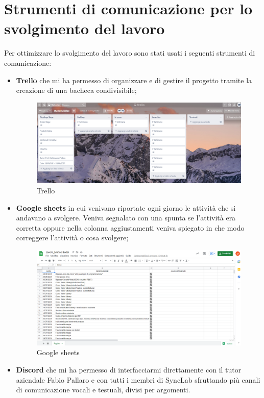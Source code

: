 \section{Strumenti di comunicazione per lo svolgimento del lavoro}
Per ottimizzare lo svolgimento del lavoro sono stati usati i seguenti strumenti di comunicazione:
\begin{itemize}
	\item \textbf{Trello} che mi ha permesso di organizzare e di gestire il progetto tramite la creazione di una bacheca condivisibile;
	\begin{figure}[htbp]	
		\centering
		\includegraphics[width=12cm]{immagini/trello.png}
		\caption{Trello}
		\label{fig:Trello}
	\end{figure}
	\item \textbf{Google sheets} in cui venivano riportate ogni giorno le attività che si andavano a svolgere. Veniva segnalato con una spunta se l'attività era corretta oppure nella colonna aggiustamenti veniva spiegato in che modo correggere l'attività o cosa svolgere;
	\begin{figure}[htbp]	
		\centering
		\includegraphics[width=12cm]{immagini/googlesheet.png}
		\caption{Google sheets}
		\label{fig:Google sheets}
	\end{figure}
	\item \textbf{Discord} che mi ha permesso di interfacciarmi direttamente
	con il tutor aziendale Fabio Pallaro e con tutti i membri di SyncLab sfruttando più canali di comunicazione vocali e testuali, divisi per argomenti.
\end{itemize}
	



